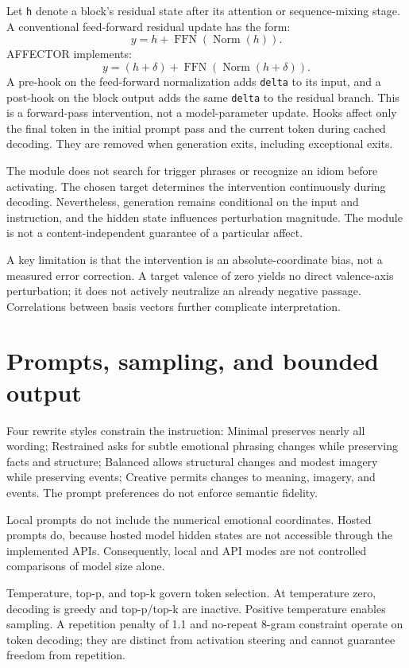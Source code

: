 \documentclass[manuscript,screen,nonacm]{acmart}
\begin{document}
Let \nolinkurl{h} denote a block's residual state after its attention or
sequence-mixing stage. A conventional feed-forward residual update has
the form:
\[y=h+\operatorname{FFN}(\operatorname{Norm}(h)).\]
AFFECTOR implements:
\[y=(h+\delta)+\operatorname{FFN}(\operatorname{Norm}(h+\delta)).\]
A pre-hook on the feed-forward normalization adds \nolinkurl{delta} to its
input, and a post-hook on the block output adds the same \nolinkurl{delta}
to the residual branch. This is a forward-pass intervention, not a
model-parameter update. Hooks affect only the final token in the initial
prompt pass and the current token during cached decoding. They are
removed when generation exits, including exceptional exits.

The module does not search for trigger phrases or recognize an idiom
before activating. The chosen target determines the intervention
continuously during decoding. Nevertheless, generation remains
conditional on the input and instruction, and the hidden state
influences perturbation magnitude. The module is not a
content-independent guarantee of a particular affect.

A key limitation is that the intervention is an absolute-coordinate
bias, not a measured error correction. A target valence of zero yields
no direct valence-axis perturbation; it does not actively neutralize an
already negative passage. Correlations between basis vectors further
complicate interpretation.


\section{Prompts, sampling, and bounded
output}\label{prompts-sampling-and-bounded-output}

Four rewrite styles constrain the instruction: Minimal preserves nearly
all wording; Restrained asks for subtle emotional phrasing changes while
preserving facts and structure; Balanced allows structural changes and
modest imagery while preserving events; Creative permits changes to
meaning, imagery, and events. The prompt preferences do not enforce
semantic fidelity.

Local prompts do not include the numerical emotional coordinates. Hosted
prompts do, because hosted model hidden states are not accessible
through the implemented APIs. Consequently, local and API modes are not
controlled comparisons of model size alone.

Temperature, top-p, and top-k govern token selection. At temperature
zero, decoding is greedy and top-p/top-k are inactive. Positive
temperature enables sampling. A repetition penalty of 1.1 and no-repeat
8-gram constraint operate on token decoding; they are distinct from
activation steering and cannot guarantee freedom from repetition.
\end{document}

